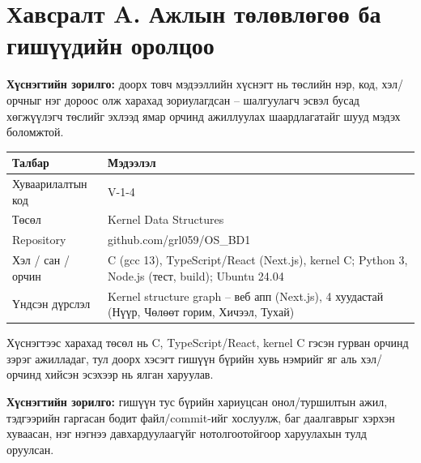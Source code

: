 \section*{Хавсралт A. Ажлын төлөвлөгөө ба гишүүдийн оролцоо}

\textbf{Хүснэгтийн зорилго:} доорх товч мэдээллийн хүснэгт нь төслийн нэр, код, хэл/орчныг нэг дороос олж харахад зориулагдсан -- шалгуулагч эсвэл бусад хөгжүүлэгч төслийг эхлээд ямар орчинд ажиллуулах шаардлагатайг шууд мэдэх боломжтой.

{\fontsize{9.5}{12}\selectfont
\begin{tabular}{|L{0.30\textwidth}|L{0.63\textwidth}|}
\hline
\textbf{Талбар} & \textbf{Мэдээлэл} \\ \hline
Хуваарилалтын код & V-1-4 \\ \hline
Төсөл & Kernel Data Structures \\ \hline
Repository & github.com/grl059/OS\_BD1 \\ \hline
Хэл / сан / орчин & C (gcc 13), TypeScript/React (Next.js), kernel C; Python 3, Node.js (тест, build); Ubuntu 24.04 \\ \hline
Үндсэн дүрслэл & Kernel structure graph -- веб апп (Next.js), 4 хуудастай (Нүүр, Чөлөөт горим, Хичээл, Тухай) \\ \hline
\end{tabular}
\par}

Хүснэгтээс харахад төсөл нь C, TypeScript/React, kernel C гэсэн гурван орчинд зэрэг ажилладаг, тул доорх хэсэгт гишүүн бүрийн хувь нэмрийг яг аль хэл/орчинд хийсэн эсэхээр нь ялган харуулав.

\textbf{Хүснэгтийн зорилго:} гишүүн тус бүрийн хариуцсан онол/туршилтын ажил, тэдгээрийн гаргасан бодит файл/commit-ийг хослуулж, баг даалгаврыг хэрхэн хуваасан, нэг нэгнээ давхардуулаагүйг нотолгоотойгоор харуулахын тулд оруулсан.

